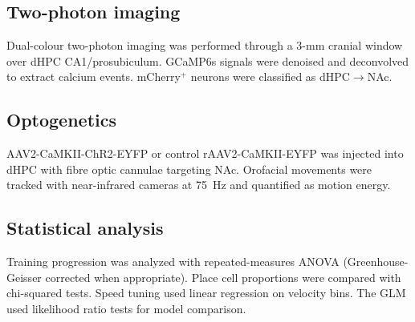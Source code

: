 \documentclass[11pt]{article}
\begin{document}
\subsection{Two-photon imaging}
Dual-colour two-photon imaging was performed through a 3-mm cranial window over dHPC CA1/prosubiculum. GCaMP6s signals were denoised and deconvolved to extract calcium events. mCherry$^{+}$ neurons were classified as dHPC$\to$NAc.

\subsection{Optogenetics}
AAV2-CaMKII-ChR2-EYFP or control rAAV2-CaMKII-EYFP was injected into dHPC with fibre optic cannulae targeting NAc. Orofacial movements were tracked with near-infrared cameras at 75~Hz and quantified as motion energy.

\subsection{Statistical analysis}
Training progression was analyzed with repeated-measures ANOVA (Greenhouse-Geisser corrected when appropriate). Place cell proportions were compared with chi-squared tests. Speed tuning used linear regression on velocity bins. The GLM used likelihood ratio tests for model comparison.


\end{document}
